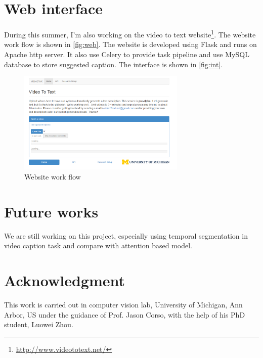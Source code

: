 \section{Web interface}
During this summer, I'm also working on the video to text website\footnote{\url{http://www.videototext.net/}}. The website work flow is shown in \autoref{fig:web}. The website is developed using Flask and runs on Apache http server. It also use Celery to provide task pipeline and use MySQL database to store suggested caption. The interface is shown in \autoref{fig:int}.

\begin{figure}[htbp]
\centering
\includegraphics[width=8cm]{resources/int.png}
\caption{Website work flow}
\label{fig:int}
\end{figure}

\section{Future works}
We are still working on this project, especially using temporal segmentation in video caption task and compare with attention based model.

\section{Acknowledgment}
This work is carried out in computer vision lab, University of Michigan, Ann Arbor, US under the guidance of Prof. Jason Corso, with the help of his PhD student, Luowei Zhou.




